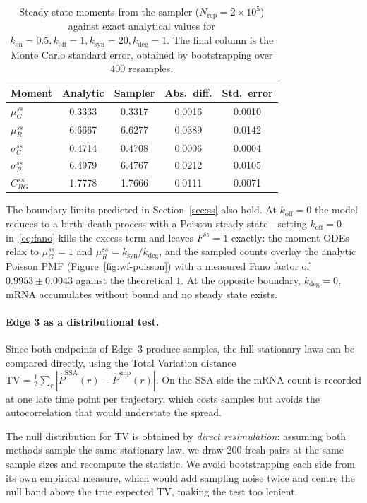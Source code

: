 \documentclass[11pt]{article}
\newcommand{\muG}{\mu_G}
\newcommand{\muR}{\mu_R}
\newcommand{\CRG}{C_{RG}}
\newcommand{\kon}{k_{\mathrm{on}}}
\newcommand{\koff}{k_{\mathrm{off}}}
\newcommand{\ksyn}{k_{\mathrm{syn}}}
\newcommand{\kdeg}{k_{\mathrm{deg}}}
\begin{document}
\begin{table}[htbp]
  \centering
  \begin{tabular}{lcccc}
  \toprule
  \textbf{Moment} & \textbf{Analytic} & \textbf{Sampler} & \textbf{Abs.\ diff.} & \textbf{Std.\ error} \\
  \midrule
  $\muG^{ss}$    & 0.3333 & 0.3317 & 0.0016 & 0.0010 \\
  $\muR^{ss}$    & 6.6667 & 6.6277 & 0.0389 & 0.0142 \\
  $\sigma_G^{ss}$ & 0.4714 & 0.4708 & 0.0006 & 0.0004 \\
  $\sigma_R^{ss}$ & 6.4979 & 6.4767 & 0.0212 & 0.0105 \\
  $\CRG^{ss}$    & 1.7778 & 1.7666 & 0.0111 & 0.0071 \\
  \bottomrule
  \end{tabular}
  \caption{Steady-state moments from the sampler ($N_{\mathrm{rep}}=2\times10^5$)
    against exact analytical values for $\kon=0.5,\koff=1,\ksyn=20,\kdeg=1$.
    The final column is the Monte Carlo standard error, obtained by bootstrapping over
    $400$ resamples.}
  \label{tab:moments}
\end{table}

The boundary limits predicted in Section~\ref{sec:ss} also hold. At $\koff=0$ the model reduces to a
birth--death process with a Poisson steady state---setting $\koff=0$ in~\eqref{eq:fano} kills the excess
term and leaves $F^{ss}=1$ exactly: the moment ODEs relax to
$\muG^{ss}=1$ and $\muR^{ss}=\ksyn/\kdeg$, and the sampled counts overlay the analytic Poisson PMF
(Figure~\ref{fig:wf-poisson}) with a measured Fano factor of $0.9953\pm0.0043$ against the
theoretical $1$. At the opposite boundary, $\kdeg=0$, mRNA accumulates without bound and no steady state
exists.

\paragraph{Edge 3 as a distributional test.}
Since both endpoints of Edge~3 produce samples, the full stationary laws can be compared directly, using the Total Variation distance
$\mathrm{TV}=\tfrac12\sum_r|\hat P^{\mathrm{SSA}}(r)-\hat P^{\mathrm{smp}}(r)|$. On the SSA side the mRNA count is recorded at one late time point per
trajectory, which costs samples but avoids the autocorrelation that would understate the spread.

The null distribution for TV is obtained by \emph{direct resimulation}: assuming both methods sample the same
stationary law, we draw 200 fresh pairs at the same sample sizes and recompute the statistic. We avoid
bootstrapping each side from its own empirical measure, which would add sampling noise twice and centre the
null band above the true expected TV, making the test too lenient.
\end{document}
